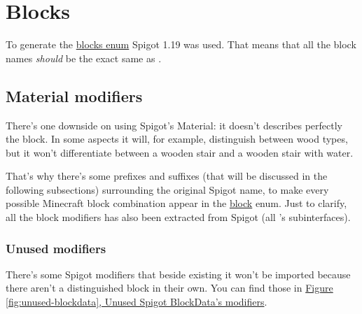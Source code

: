\section{Blocks}\label{appendix:blocks}
To generate the \hyperref[type:block]{blocks enum} Spigot 1.19 was used.
That means that all the block names \textit{should} be the exact same as \cite{spigot-material}.

\subsection{Material modifiers}
There's one downside on using Spigot's Material: it doesn't describes perfectly the block. In some aspects it will, for example, distinguish between wood types, but it won't differentiate between a wooden stair and a wooden stair with water.

That's why there's some prefixes and suffixes (that will be discussed in the following subsections) surrounding the original Spigot name, to make every possible Minecraft block combination appear in the \hyperref[type:block]{block} enum. Just to clarify, all the block modifiers has also been extracted from Spigot (all \cite{spigot-blockdata}'s subinterfaces).

\subsubsection{Unused modifiers}
There's some Spigot modifiers that beside existing it won't be imported because there aren't a distinguished block in their own. You can find those in \hyperref[fig:unused-blockdata]{Figure \ref{fig:unused-blockdata}, Unused Spigot BlockData's modifiers}.


